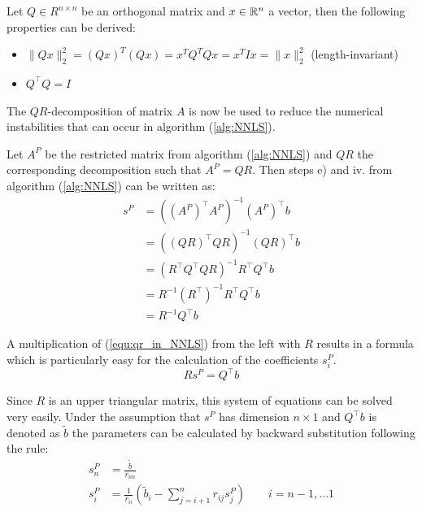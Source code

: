 \begin{remark} Let $Q \in R^{n \times n}$ be an orthogonal matrix and $x \in \mathbb{R}^n$ a vector, then the following properties can be derived:
	\begin{itemize}
		\item $\lVert Qx \rVert_2^2 = (Qx)^T (Qx) = x^T Q^T Q x = x^T I x = \lVert x \rVert_2^2$ \hfill (length-invariant)
		\item $Q^\top Q = I$
	\end{itemize}
\end{remark}

The $QR$-decomposition of matrix $A$ is now be used to reduce the numerical instabilities that can occur in algorithm (\ref{alg:NNLS}). 

\begin{remark} Let $A^P$ be the restricted matrix from algorithm (\ref{alg:NNLS}) and $QR$ the corresponding decomposition such that $A^P = QR$. Then steps e) and iv. from algorithm (\ref{alg:NNLS}) can be written as:
	\begin{equation}\label{equ:qr_in_NNLS}
		\begin{aligned}
			 s^P 	&= ((A^P)^\top A^P)^{-1} (A^P)^\top b \\
			 		&= ((QR)^\top QR)^{-1} (QR)^\top b \\
			 		&= (R^\top Q^\top Q R)^{-1} R^\top Q^\top b \\
			 		&= R^{-1} (R^\top)^{-1} R^\top Q^\top b \\
			 		&= R^{-1} Q^\top b
		\end{aligned}
	\end{equation}
\end{remark}

A multiplication of (\ref{equ:qr_in_NNLS}) from the left with $R$ results in a formula which is particularly easy for the calculation of the coefficients $s^P_i$.
\begin{equation}
	R s^P = Q^\top b
\end{equation}

Since $R$ is an upper triangular matrix, this system of equations can be solved very easily. Under the assumption that $s^P$ has dimension $n \times 1$ and $Q^\top b$ is denoted as $\tilde{b}$ the parameters can be calculated by backward substitution following the rule:
\begin{align*}
	s^P_n 	&= \frac{\tilde{b}}{r_{nn}} \\
	s^P_i	&= \frac{1}{r_{ii}} \left( \tilde{b}_i - \sum_{j = i + 1}^{n} r_{ij} s^P_j\right) \quad \quad i = n-1, ... 1
\end{align*}

